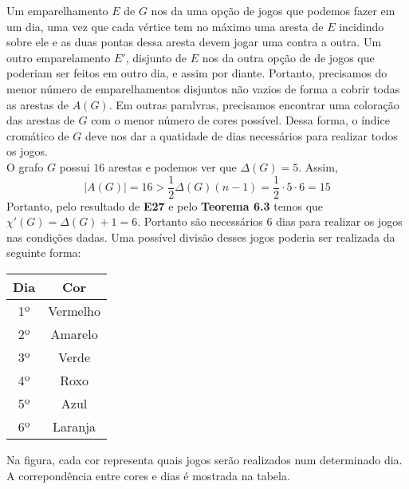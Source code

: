 \documentclass[11pt,a4paper,notitlepage]{exam}
\begin{document}
  Um emparelhamento $E$ de $G$ nos da uma opção de jogos que podemos
  fazer em um dia, uma vez que cada vértice tem no máximo uma aresta de
  $E$ incidindo sobre ele e as duas pontas dessa aresta devem jogar uma
  contra a outra. Um outro emparelamento $E'$, disjunto de $E$
  nos da outra opção de de jogos que poderiam ser feitos em outro dia, e
  assim por diante.
  Portanto, precisamos do menor número de emparelhamentos disjuntos não
  vazios de
  forma a cobrir todas as arestas de $A(G)$. Em outras paralvras,
  precisamos encontrar uma coloração das arestas de $G$ com o menor
  número de cores possível. Dessa forma, o índice cromático de $G$ deve
  nos dar a quatidade de dias necessários para realizar todos os jogos.\\
  O grafo $G$ possui $16$ arestas e podemos ver que $\Delta(G) = 5$.
  Assim, $$|A(G)| = 16 > \frac{1}{2}\Delta(G)(n-1) = \dfrac{1}{2}\cdot5\cdot6 =
  15$$
  Portanto, pelo resultado de \textbf{E27} e pelo \textbf{Teorema 6.3}
  temos que $\chi'(G) = \Delta(G)+1 = 6$. Portanto são necessários $6$
  dias para realizar os jogos nas condições dadas. Uma possível divisão
  desses jogos poderia ser realizada da seguinte forma:
\begin{center} 
       \hspace{50px}
\begin{tabular}{|c|c|}
\hline
\textbf{Dia} & \textbf{Cor} \\ \hline
1º           & Vermelho     \\ \hline
2º           & Amarelo      \\ \hline
3º           & Verde        \\ \hline
4º           & Roxo         \\ \hline
5º           & Azul         \\ \hline
6º           & Laranja      \\ \hline
\end{tabular}
  \end{center}
  Na figura, cada cor representa quais jogos serão realizados num
  determinado dia. A correpondência entre cores e
  dias é mostrada na tabela.
\end{document}
